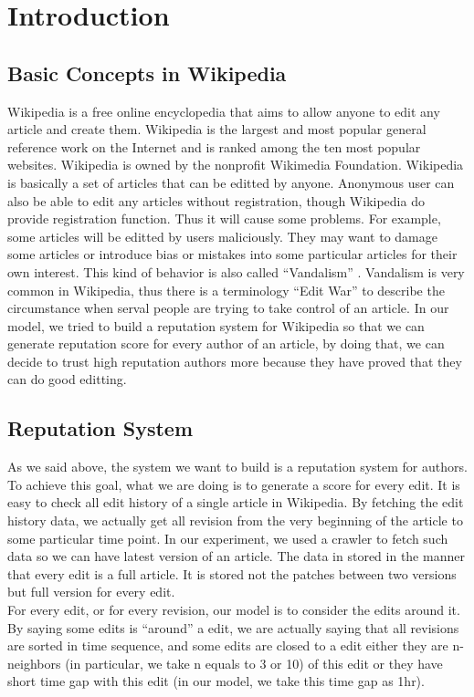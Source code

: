 \documentclass[preprint,review,12pt]{elsarticle}
\begin{document}
\section{Introduction}
\subsection{Basic Concepts in Wikipedia}
Wikipedia is a free online encyclopedia that aims to allow anyone to edit any
article and create them. Wikipedia is the largest and most popular general
reference work on the Internet and is ranked among the ten most popular
websites. Wikipedia is owned by the nonprofit Wikimedia
Foundation.\cite{wiki:wiki} Wikipedia is basically a set of articles that can be
editted by anyone. Anonymous user can also be able to edit any articles without
registration, though Wikipedia do provide registration function.
Thus it will
cause some problems. For example, some
articles will be editted by users maliciously. They may want to damage some
articles or introduce bias or mistakes into some particular articles for their
own interest. This kind of behavior is also called ``Vandalism''
\cite{wiki:vandalism}. Vandalism is very common in Wikipedia, thus there is a
terminology ``Edit War''\cite{wiki:edit_war} to describe the circumstance when
serval people are trying to take control of an article. In our model, we tried
to build a reputation system for Wikipedia so that we can generate reputation
score for every author of an article, by doing that, we can decide to trust high
reputation authors more because they have proved that they can do good editting.
\subsection{Reputation System}
As we said above, the system we want to build is a reputation system for
authors. To achieve this goal, what we are doing is to generate a score for
every edit. It is easy to check all edit history of a single article in
Wikipedia. By fetching the edit history data, we actually get all revision from
the very beginning of the article to some particular time point. In our
experiment, we used a crawler to fetch such data so we can have latest version
of an article. The data in stored in the manner that every edit is a full
article. It is stored not the patches between two versions but full version for
every edit. \\
For every edit, or for every revision, our model is to consider the edits around
it. By saying some edits is ``around'' a edit, we are actually saying that
all revisions are sorted in time sequence, and some edits are closed to a edit
either they are n-neighbors (in particular, we take n equals to 3 or 10) of this
edit or they have short time gap with this edit (in our model, we take this time
gap as 1hr).
\end{document}
